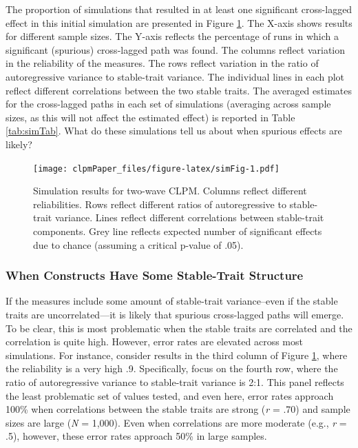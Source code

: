 \documentclass[
  english,
  man,floatsintext]{apa6}
\begin{document}
The proportion of simulations that resulted in at least one significant cross-lagged effect in this initial simulation are presented in Figure \ref{fig:simFig}. The X-axis shows results for different sample sizes. The Y-axis reflects the percentage of runs in which a significant (spurious) cross-lagged path was found. The columns reflect variation in the reliability of the measures. The rows reflect variation in the ratio of autoregressive variance to stable-trait variance. The individual lines in each plot reflect different correlations between the two stable traits. The averaged estimates for the cross-lagged paths in each set of simulations (averaging across sample sizes, as this will not affect the estimated effect) is reported in Table \ref{tab:simTab}. What do these simulations tell us about when spurious effects are likely?

\begin{figure}
\centering
\texttt{[image: clpmPaper\_files/figure-latex/simFig-1.pdf]}
\caption{\label{fig:simFig}Simulation results for two-wave CLPM. Columns reflect different reliabilities. Rows reflect different ratios of autoregressive to stable-trait variance. Lines reflect different correlations between stable-trait components. Grey line reflects expected number of significant effects due to chance (assuming a critical p-value of .05).}
\end{figure}

\hypertarget{when-constructs-have-some-stable-trait-structure}{%
\subsubsection{When Constructs Have Some Stable-Trait Structure}\label{when-constructs-have-some-stable-trait-structure}}

If the measures include some amount of stable-trait variance--even if the stable traits are uncorrelated---it is likely that spurious cross-lagged paths will emerge. To be clear, this is most problematic when the stable traits are correlated and the correlation is quite high. However, error rates are elevated across most simulations. For instance, consider results in the third column of Figure \ref{fig:simFig}, where the reliability is a very high .9. Specifically, focus on the fourth row, where the ratio of autoregressive variance to stable-trait variance is 2:1. This panel reflects the least problematic set of values tested, and even here, error rates approach 100\% when correlations between the stable traits are strong (\emph{r} = .70) and sample sizes are large (\emph{N} = 1,000). Even when correlations are more moderate (e.g., \emph{r} = .5), however, these error rates approach 50\% in large samples.
\end{document}
